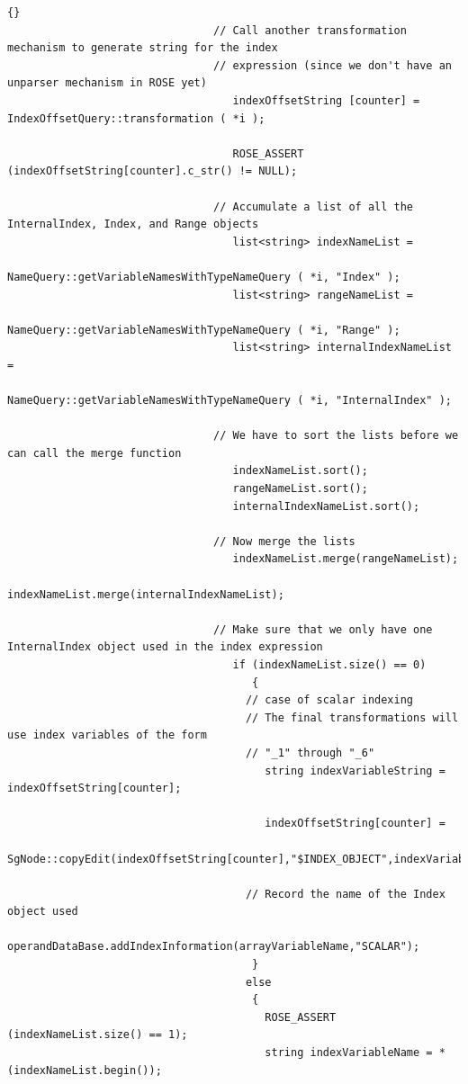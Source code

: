 \documentclass[10pt]{article}
\begin{document}
{\begin{lstlisting}{}
                                // Call another transformation mechanism to generate string for the index
                                // expression (since we don't have an unparser mechanism in ROSE yet)
                                   indexOffsetString [counter] = IndexOffsetQuery::transformation ( *i );

                                   ROSE_ASSERT (indexOffsetString[counter].c_str() != NULL);

                                // Accumulate a list of all the InternalIndex, Index, and Range objects
                                   list<string> indexNameList =
                                        NameQuery::getVariableNamesWithTypeNameQuery ( *i, "Index" );
                                   list<string> rangeNameList =
                                        NameQuery::getVariableNamesWithTypeNameQuery ( *i, "Range" );
                                   list<string> internalIndexNameList =
                                        NameQuery::getVariableNamesWithTypeNameQuery ( *i, "InternalIndex" );

                                // We have to sort the lists before we can call the merge function
                                   indexNameList.sort();
                                   rangeNameList.sort();
                                   internalIndexNameList.sort();

                                // Now merge the lists
                                   indexNameList.merge(rangeNameList);
                                   indexNameList.merge(internalIndexNameList);

                                // Make sure that we only have one InternalIndex object used in the index expression
                                   if (indexNameList.size() == 0)
                                      {
                                     // case of scalar indexing
                                     // The final transformations will use index variables of the form
                                     // "_1" through "_6"
                                        string indexVariableString = indexOffsetString[counter];

                                        indexOffsetString[counter] =
                                             SgNode::copyEdit(indexOffsetString[counter],"$INDEX_OBJECT",indexVariableString);

                                     // Record the name of the Index object used
                                        operandDataBase.addIndexInformation(arrayVariableName,"SCALAR");
                                      }
                                     else
                                      {
                                        ROSE_ASSERT (indexNameList.size() == 1);
                                        string indexVariableName = *(indexNameList.begin());


\end{lstlisting}}
\end{document}
